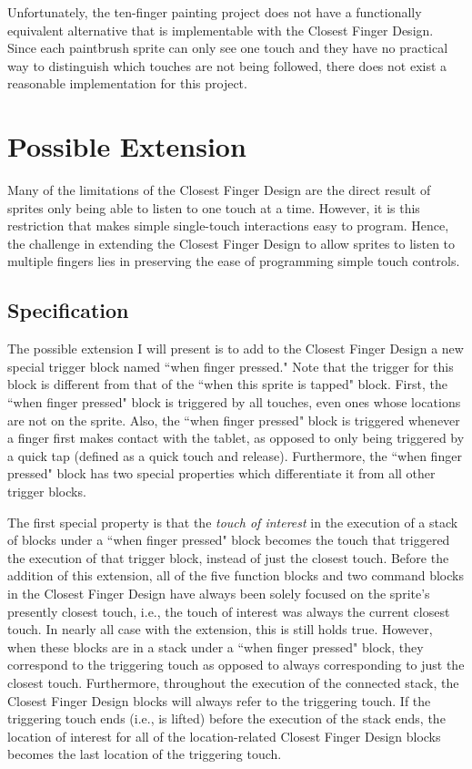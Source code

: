 Unfortunately, the ten-finger painting project does not have a functionally equivalent alternative that is implementable with the Closest Finger Design. Since each paintbrush sprite can only see one touch and they have no practical way to distinguish which touches are not being followed, there does not exist a reasonable implementation for this project.

\section{Possible Extension}

Many of the limitations of the Closest Finger Design are the direct result of sprites only being able to listen to one touch at a time. However, it is this restriction that makes simple single-touch interactions easy to program. Hence, the challenge in extending the Closest Finger Design to allow sprites to listen to multiple fingers lies in preserving the ease of programming simple touch controls.

\subsection{Specification}
The possible extension I will present is to add to the Closest Finger Design a new special trigger block  named ``when finger pressed." Note that the trigger for this block is different from that of the ``when this sprite is tapped" block. First, the ``when finger pressed" block is triggered by all touches, even ones whose locations are not on the sprite. Also, the ``when finger pressed" block is triggered whenever a finger first makes contact with the tablet, as opposed to only being triggered by a quick tap (defined as a quick touch and release). Furthermore, the ``when finger pressed"  block has two special properties which differentiate it from all other trigger blocks.

The first special property is that the \emph{touch of interest} in the execution of a stack of blocks under a ``when finger pressed" block becomes the touch that triggered the execution of that trigger block, instead of just the closest touch. Before the addition of this extension, all of the five function blocks and two command blocks in the Closest Finger Design have always been solely focused on the sprite's presently closest touch, i.e., the touch of interest was always the current closest touch. In nearly all case with the extension, this is still holds true. However, when these blocks are in a stack under a ``when finger pressed" block, they correspond to the triggering touch as opposed to always corresponding to just the closest touch. Furthermore, throughout the execution of the connected stack, the Closest Finger Design blocks will always refer to the triggering touch. If the triggering touch ends (i.e., is lifted) before the execution of the stack ends, the location of interest for all of the location-related Closest Finger Design blocks becomes the last location of the triggering touch. 

